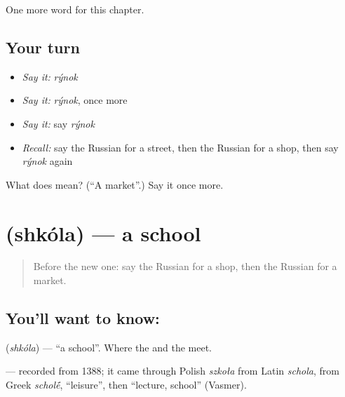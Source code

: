 \begin{grammarlens}[title={What you've built}]
One more word for this chapter.
\end{grammarlens}

\subsection*{Your turn}
\begin{itemize}
\raggedright
  \item \emph{Say it:} \emph{rýnok}
  \item \emph{Say it:} \emph{rýnok}, once more
  \item \emph{Say it:} say \emph{rýnok}
  \item \emph{Recall:} say the Russian for a street, then the Russian for a shop, then say \emph{rýnok} again
\end{itemize}

\begin{tcolorbox}[breakable,colback=teal!4,colframe=teal!35!black,title={Before you move on}]
What does  mean? (\textquotedblleft{}A market\textquotedblright{}.) Say it once more.
\end{tcolorbox}
\section[\texorpdfstring{\ru{школа} (shkóla)}{школа (shkóla)}]{ (shkóla) — a school}

\label{lesson:RU-C77-school}



\begin{quote}
Before the new one: say the Russian for a shop, then the Russian for a market.
\end{quote}

\subsection*{You'll want to know: }
\textbf{} (\emph{shkóla}) — \textquotedblleft{}a school\textquotedblright{}. Where the \textbf{} and the \textbf{} meet.

\begin{cousinweb}
\textbf{} — recorded from 1388; it came through Polish \emph{szkoła} from Latin \emph{schola}, from Greek \emph{schol\'{\={e}}}, \textquotedblleft{}leisure\textquotedblright{}, then \textquotedblleft{}lecture, school\textquotedblright{} (Vasmer).
\end{cousinweb}

